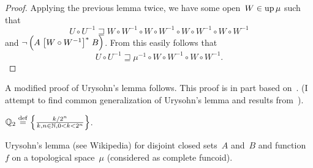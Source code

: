 \begin{proof}
Applying the previous lemma twice, we have some open~$W\in\operatorname{up}\mu$ such that
\[ U\circ U^{-1} \sqsupseteq W \circ W^{-1}\circ W \circ W^{- 1} \circ W \circ W^{-1}\circ W \circ W^{- 1} \]
and $\neg \left( A \mathrel{\left[W \circ W^{-1}\right]^{\ast}} B \right)$.
From this easily follows that \[ U \circ U^{- 1} \sqsupseteq \mu^{-1} \circ W \circ W^{-1}\circ W \circ W^{- 1}. \]
\end{proof}

A modified proof of Urysohn's lemma follows. This proof is in part based on~\cite{2014arXiv1410.1504B}.
(I attempt to find common generalization of Urysohn's lemma and results from~\cite{2014arXiv1410.1504B}).

$\mathbb{Q}_2 \overset{\mathrm{def}}{=} \left\{ \frac{ k/2^n }{k, n \in \mathbb{N}, 0 < k < 2^n }\right\}$.

\begin{thm}
Urysohn's lemma (see Wikipedia) for disjoint closed sets~$A$ and~$B$ and function~$f$ on a topological space~$\mu$
(considered as complete funcoid).
\end{thm}

